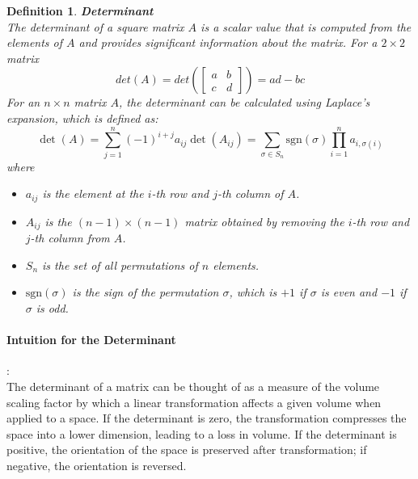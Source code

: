 \documentclass[11pt]{book} %
\newtheorem{definition}{Definition}[section]
\begin{document}
\begin{definition}{\textbf{Determinant}} \\
    The determinant of a square matrix \( A \) is a scalar value that is computed from the elements of \( A \) and provides significant information about the matrix.     
    For a \( 2 \times 2 \) matrix 
    \[
    det(A) = det( \begin{bmatrix} a & b \\ c & d \end{bmatrix} ) = ad - bc
    \]
    For an \( n \times n \) matrix \( A \), the determinant can be calculated using Laplace's expansion, which is defined as:
    \[
    \det(A) = \sum_{j=1}^{n} (-1)^{i+j} a_{ij} \det(A_{ij}) = \sum_{\sigma \in S_n} \text{sgn}(\sigma) \prod_{i=1}^{n} a_{i, \sigma(i)}
    \]
    where 
    \begin{itemize}
        \item \( a_{ij} \) is the element at the \( i \)-th row and \( j \)-th column of \( A \).
        \item \( A_{ij} \) is the \((n-1) \times (n-1)\) matrix obtained by removing the \( i \)-th row and \( j \)-th column from \( A \).
        \item \( S_n \) is the set of all permutations of \( n \) elements.
        \item \( \text{sgn}(\sigma) \) is the sign of the permutation \( \sigma \), which is \( +1 \) if \( \sigma \) is even and \( -1 \) if \( \sigma \) is odd.
    \end{itemize}
\end{definition}

\paragraph{Intuition for the Determinant} : \\
The determinant of a matrix can be thought of as a measure of the volume scaling factor by which a linear transformation affects a given volume when applied to a space. 
If the determinant is zero, the transformation compresses the space into a lower dimension, leading to a loss in volume. 
If the determinant is positive, the orientation of the space is preserved after transformation; if negative, the orientation is reversed.
\end{document}
